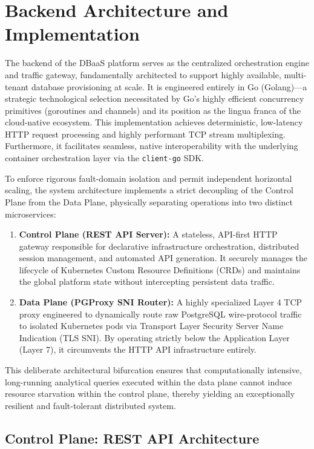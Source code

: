 \section{Backend Architecture and Implementation}

The backend of the DBaaS platform serves as the centralized orchestration engine and traffic gateway, fundamentally architected to support highly available, multi-tenant database provisioning at scale. It is engineered entirely in Go (Golang)—a strategic technological selection necessitated by Go's highly efficient concurrency primitives (goroutines and channels) and its position as the lingua franca of the cloud-native ecosystem. This implementation achieves deterministic, low-latency HTTP request processing and highly performant TCP stream multiplexing. Furthermore, it facilitates seamless, native interoperability with the underlying container orchestration layer via the \texttt{client-go} SDK.

To enforce rigorous fault-domain isolation and permit independent horizontal scaling, the system architecture implements a strict decoupling of the Control Plane from the Data Plane, physically separating operations into two distinct microservices:

\begin{enumerate}
    \item \textbf{Control Plane (REST API Server):} A stateless, API-first HTTP gateway responsible for declarative infrastructure orchestration, distributed session management, and automated API generation. It securely manages the lifecycle of Kubernetes Custom Resource Definitions (CRDs) and maintains the global platform state without intercepting persistent data traffic.
    \item \textbf{Data Plane (PGProxy SNI Router):} A highly specialized Layer 4 TCP proxy engineered to dynamically route raw PostgreSQL wire-protocol traffic to isolated Kubernetes pods via Transport Layer Security Server Name Indication (TLS SNI). By operating strictly below the Application Layer (Layer 7), it circumvents the HTTP API infrastructure entirely.
\end{enumerate}

This deliberate architectural bifurcation ensures that computationally intensive, long-running analytical queries executed within the data plane cannot induce resource starvation within the control plane, thereby yielding an exceptionally resilient and fault-tolerant distributed system.

\subsection{Control Plane: REST API Architecture}

